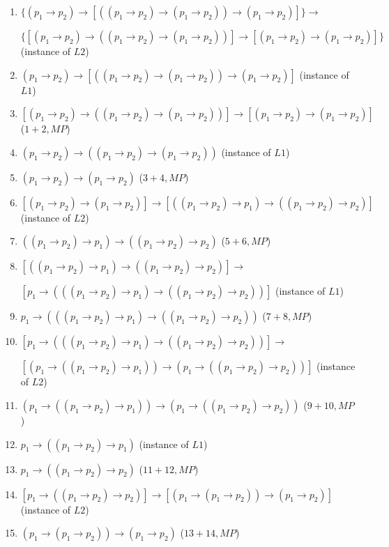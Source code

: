 \documentclass[UTF8,12pt,a4paper]{ctexart}
\begin{document}
\begin{enumerate}
	\item  $ \{ (p_1 \to p_2) \to [ ( (p_1 \to p_2) \to (p_1 \to p_2) )  \to (p_1 \to p_2)   ] \} \to $
	
	$ \{ [ (p_1 \to p_2) \to ( (p_1 \to p_2) \to (p_1 \to p_2) ) ] \to [(p_1 \to p_2) \to (p_1 \to p_2)]  \}$
	\hfill (instance of $L2$)
	
	
	\item $(p_1 \to p_2) \to [ ( (p_1 \to p_2) \to (p_1 \to p_2) )  \to (p_1 \to p_2)   ]$
	\hfill (instance of $L1$)
	
	\item $[ (p_1 \to p_2) \to ( (p_1 \to p_2) \to (p_1 \to p_2) ) ] \to [(p_1 \to p_2) \to (p_1 \to p_2)] $ 
	\hfill ($1+2, MP$)
	
	\item $(p_1 \to p_2) \to ( (p_1 \to p_2) \to (p_1 \to p_2) ) $ 
	\hfill (instance of $L1$)
	
	\item $(p_1 \to p_2) \to (p_1 \to p_2)$  
	\hfill ($3+4, MP$)
	
	\item $[ (p_1 \to p_2) \to (p_1 \to p_2)]   \to [ ((p_1 \to p_2) \to p_1)  \to ((p_1 \to p_2) \to p_2)  ]$ 
	\hfill (instance of $L2$)
	
	\item $((p_1 \to p_2) \to p_1)  \to ((p_1 \to p_2) \to p_2)$ 
	\hfill ($5+6, MP$)
	
	\item $ [ ((p_1 \to p_2) \to p_1)  \to ((p_1 \to p_2) \to p_2) ]  \to $ 
	
	$
	[ p_1 \to ( ((p_1 \to p_2) \to p_1)  \to ((p_1 \to p_2) \to p_2) )  ]$
	\hfill (instance of $L1$)
	
	\item $p_1 \to ( ((p_1 \to p_2) \to p_1)  \to ((p_1 \to p_2) \to p_2) )  $ 
	\hfill ($7+8, MP$)
	
	\item $ [p_1 \to ( ((p_1 \to p_2) \to p_1)  \to ((p_1 \to p_2) \to p_2) )   ] \to$
	
	$[ (p_1 \to ((p_1 \to p_2) \to p_1))   \to (p_1 \to ((p_1 \to p_2) \to p_2))   ]$
	\hfill (instance of $L2$)
	
	\item $(p_1 \to ((p_1 \to p_2) \to p_1))   \to (p_1 \to ((p_1 \to p_2) \to p_2))  $  
	\hfill ($9+10,MP$)
	
	\item $p_1 \to ((p_1 \to p_2) \to p_1)$  
	\hfill (instance of $L1$)
	
	\item $ p_1 \to ((p_1 \to p_2) \to p_2)$  
	\hfill ($11+12, MP$)
	
	\item $[ p_1 \to ((p_1 \to p_2) \to p_2)]  \to [ (p_1 \to (p_1 \to p_2)) \to (p_1 \to p_2) ]$
	\hfill (instance of $L2$) 
	
	\item  $(p_1 \to (p_1 \to p_2)) \to (p_1 \to p_2)$
	\hfill ($13+14, MP$) 
\end{enumerate}
\end{document}

